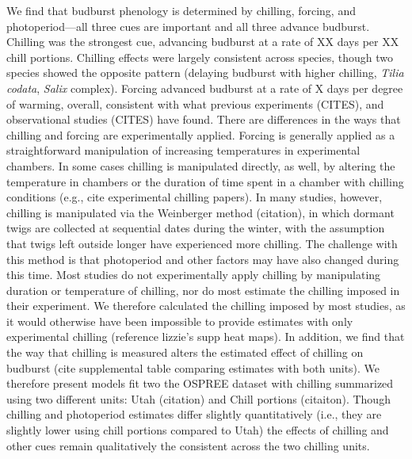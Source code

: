 \documentclass[11pt,letter]{article}
\begin{document}
\par We find that budburst phenology is determined by chilling, forcing, and photoperiod---all three cues are important and all three advance budburst. Chilling was the strongest cue, advancing budburst at a rate of XX days per XX chill portions. Chilling effects were largely consistent across species, though two species showed the opposite pattern (delaying budburst with higher chilling, \emph{Tilia codata}, \emph{Salix} complex). Forcing advanced budburst at a rate of X days per degree of warming, overall, consistent with what previous experiments (CITES), and observational studies (CITES) have found. There are differences in the ways that chilling and forcing are experimentally applied. Forcing is generally applied as a straightforward manipulation of increasing temperatures in experimental chambers. In some cases chilling is manipulated directly, as well, by altering the temperature in chambers or the duration of time spent in a chamber with chilling conditions (e.g., cite experimental chilling papers). In many studies, however, chilling is manipulated via the Weinberger method (citation), in which dormant twigs are collected at sequential dates during the winter, with the assumption that twigs left outside longer have experienced more chilling. The challenge with this method is that photoperiod and other factors may have also changed during this time. Most studies do not experimentally apply chilling by manipulating duration or temperature of chilling, nor do most estimate the chilling imposed in their experiment. We therefore calculated the chilling imposed by most studies, as it would otherwise have been impossible to provide estimates with only experimental chilling (reference lizzie's supp heat maps). %
In addition, we find that the way that chilling is measured alters the estimated effect of chilling on budburst (cite supplemental table comparing estimates with both units). We therefore present models fit two the OSPREE dataset with chilling summarized using two different units: Utah (citation) and Chill portions (citaiton). Though chilling and photoperiod estimates differ slightly quantitatively (i.e., they are slightly lower using chill portions compared to Utah) the effects of chilling and other cues remain qualitatively the consistent across the two chilling units.  
\end{document}
